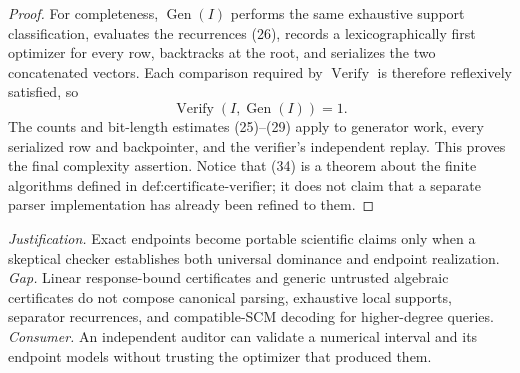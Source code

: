 \documentclass{article}
\begin{document}
\begin{proof}
For completeness, \(\operatorname{Gen}(I)\) performs the same exhaustive support classification, evaluates the recurrences (26), records a lexicographically first optimizer for every row, backtracks at the root, and serializes the two concatenated vectors.  Each comparison required by \(\operatorname{Verify}\) is therefore reflexively satisfied, so
\[
\operatorname{Verify}(I,\operatorname{Gen}(I))=1. \tag{34}
\]
The counts and bit-length estimates (25)--(29) apply to generator work, every serialized row and backpointer, and the verifier's independent replay.  This proves the final complexity assertion.  Notice that (34) is a theorem about the finite algorithms defined in \(\text{def:certificate-verifier}\); it does not claim that a separate parser implementation has already been refined to them.
\end{proof}
\par\smallskip\noindent \textit{Justification.} Exact endpoints become portable scientific claims only when a skeptical checker establishes both universal dominance and endpoint realization. \textit{Gap.} Linear response-bound certificates and generic untrusted algebraic certificates do not compose canonical parsing, exhaustive local supports, separator recurrences, and compatible-SCM decoding for higher-degree queries. \textit{Consumer.} An independent auditor can validate a numerical interval and its endpoint models without trusting the optimizer that produced them.
\end{document}
